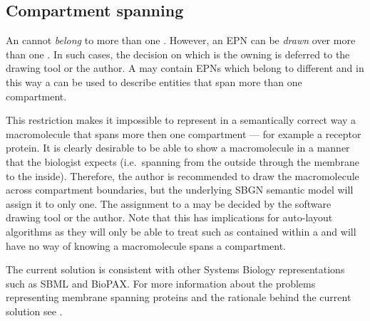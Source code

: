 \subsection{Compartment spanning}

An  cannot \emph{belong} to more than one
. However, an EPN can be \emph{drawn} over more than one
. In such cases, the decision on which is the owning
 is deferred to the drawing tool or the
author. A  may contain EPNs which belong to different
 and in this way a  can be used to describe
entities that span more than one {compartment}.

This restriction makes it impossible to represent in a semantically
correct way a macromolecule that spans more then one compartment ---
for example a receptor protein. It is clearly desirable to be able to
show a macromolecule in a manner that the biologist expects (i.e.\,
spanning from the outside through the membrane to the
inside). Therefore, the author is recommended to draw the
macromolecule across compartment boundaries, but the underlying SBGN
semantic model will assign it to only one. The assignment to a
 may be decided by the software drawing tool or the
author. Note that this has implications for auto-layout algorithms as
they will only be able to treat such  as contained within
a  and will have no way of knowing a macromolecule spans a
compartment.

The current solution is consistent with other Systems Biology
representations such as SBML and BioPAX. For more information about the
problems representing membrane spanning proteins and the rationale
behind the current solution see .


